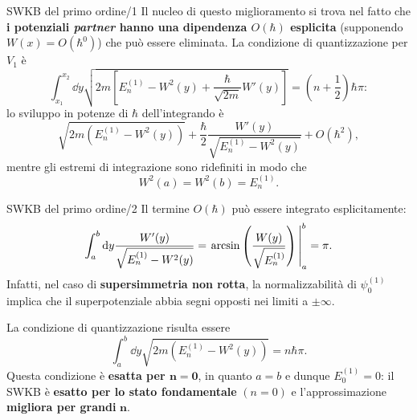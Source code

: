 \documentclass[11pt,aspectratio=169,handout]{beamer}
\begin{document}
\begin{frame}{SWKB del primo ordine/1}
    Il nucleo di questo miglioramento si trova nel fatto che \textbf{i potenziali
    \textit{partner} hanno una dipendenza $O(\hbar)$ esplicita} (supponendo
    $W(x)=O(\hbar^0)$) che può essere eliminata.
    La condizione di quantizzazione per $V_1$ è
    $$
    \int_{x_1}^{x_2}\dd y \sqrt{2m\left[E^{(1)}_n-W^2(y)+\frac{\hbar}{\sqrt{2m}}W'(y)
    \right]}
    =\left(n+\frac{1}{2}\right)\hbar\pi:
    $$
    lo sviluppo in potenze di $\hbar$ dell'integrando è
    $$\sqrt{2m\left(E_n^{(1)}-W^2(y)\right)}+\frac{\hbar}{2}\frac{W'(y)}
    {\sqrt{E_n^{(1)}-W^2(y)}}+O(\hbar^2),$$
    mentre gli estremi di integrazione sono ridefiniti in modo che
    $$W^2(a)=W^2(b)=E_n^{(1)}.$$
\end{frame}
\begin{frame}{SWKB del primo ordine/2}
    Il termine $O(\hbar)$ può essere integrato esplicitamente:
    $$\int_{a}^{b} \dd y \frac{W'(y)}{\sqrt{E_n^{(1)}-W^2(y)}} = \eval{
    \arcsin\left(\frac{W(y)}{\sqrt{E_n^{(1)}}}\right)}_a^b=\pi.$$
    Infatti, nel caso di \textbf{supersimmetria non rotta}, la normalizzabilità di
    $\psi_0^{(1)}$ implica che il superpotenziale abbia segni opposti nei
    limiti a $\pm\infty$.

    La condizione di quantizzazione risulta essere
    $$\int_{a}^{b} \dd y\sqrt{2m\left(E_n^{(1)}-W^2(y)\right)}=n\hbar\pi.$$
    Questa condizione è \textbf{esatta per $\mathbf{n=0}$}, in quanto $a=b$ e dunque
    $E_0^{(1)}=0$: il SWKB è \textbf{esatto per lo stato fondamentale} $(n=0)$ e
    l'approssimazione \textbf{migliora per grandi} $\mathbf{n}$.
\end{frame}
\end{document}
